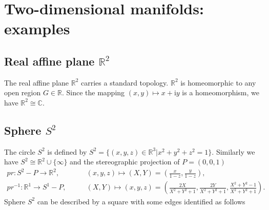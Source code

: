 \documentclass{report}
\theoremstyle{nonumberplain}
\begin{document}
\section{Two-dimensional manifolds: examples}
\subsection{Real affine plane $\mathbb{R}^2$}
The real affine plane $\mathbb{R}^2$ carries a standard topology. $\mathbb{R}^2$ is homeomorphic to any open region $G\in\mathbb{R}$.
Since the mapping $(x,y)\mapsto x+\mathrm{i}y$ is a homeomorphism, we have $\mathbb{R}^2\cong \mathbb{C}$.

\subsection{Sphere $S^2$}
The circle $S^2$ is defined by $S^2=\{(x,y,z)\in\mathbb{R}^3|x^2+y^2+z^2=1\}$. Similarly we have $S^2\cong \mathbb{R}^2\cup\{\infty\}$ and the stereographic projection of $P=(0,0,1)$
\begin{align*}
	pr:S^2-P\longrightarrow \mathbb{R}^2,\qquad      & (x, y,z) \longmapsto (X,Y)=\left(\frac{x}{1-z}, \frac{y}{1-z}\right),                                                             \\
	pr^{-1}:\mathbb{R}^1\longrightarrow S^1-P,\qquad & (X,Y) \longmapsto(x, y,z)=\left(\frac{2 X}{X^{2}+Y^{2}+1}, \frac{2 Y}{X^{2}+Y^{2}+1}, \frac{X^{2}+Y^{2}-1}{X^{2}+Y^{2}+1}\right).
\end{align*}
Sphere $S^2$ can be described by a square with some edges identified as follows
\begin{center}
\end{center}
\end{document}
